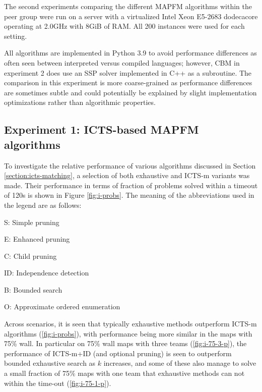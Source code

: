 \documentclass[english]{article}
\begin{document}
	The second experiments comparing the different MAPFM algorithms within the peer group were run on a server with a virtualized Intel Xeon E5-2683 dodecacore operating at 2.0GHz with 8GiB of RAM. All 200 instances were used for each setting.
	
	All algorithms are implemented in Python 3.9 to avoid performance differences as often seen between interpreted versus compiled languages; however, CBM \cite{baauw2021} in experiment 2 does use an SSP solver implemented in C++ as a subroutine. The comparison in this experiment is more coarse-grained as performance differences are sometimes subtle and could potentially be explained by slight implementation optimizations rather than algorithmic properties.
	
	\subsection{Experiment 1: ICTS-based MAPFM algorithms}
	To investigate the relative performance of various algorithms discussed in Section \ref{section:icts-matching}, a selection of both exhaustive and ICTS-m variants was made. Their performance in terms of fraction of problems solved within a timeout of 120s is shown in Figure \ref{fig:i-probs}. The meaning of the abbreviations used in the legend are as follows:
	\begin{itemize}
		\begin{minipage}{0.45\linewidth}
			\item S: Simple pruning
			\item E: Enhanced pruning
			\item C: Child pruning
		\end{minipage}
		\begin{minipage}{0.45\linewidth}
			\item ID: Independence detection
			\item B: Bounded search
			\item O: Approximate ordered enumeration
		\end{minipage}
	\end{itemize}
	Across scenarios, it is seen that typically exhaustive methods outperform ICTS-m algorithms (\ref{fig:i-probs}), with performance being more similar in the maps with 75\% wall. In particular on 75\% wall maps with three teams (\ref{fig:i-75-3-p}), the performance of ICTS-m+ID (and optional pruning) is seen to outperform bounded exhaustive search as $k$ increases, and some of these also manage to solve a small fraction of 75\% maps with one team that exhaustive methods can not within the time-out (\ref{fig:i-75-1-p}).
	
\end{document}
